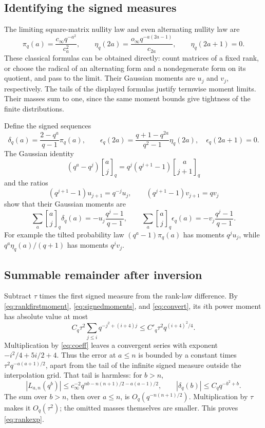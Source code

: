 \documentclass[11pt]{article}
\theoremstyle{definition}\newtheorem{definition}[theorem]{Definition}
\theoremstyle{remark}\newtheorem{remark}[theorem]{Remark}
\newcommand{\gb}[2]{\genfrac{[}{]}{0pt}{}{#1}{#2}_{q}}
\newcommand{\1}{\mathbf 1}
\begin{document}
\subsection{Identifying the signed measures}
The limiting square-matrix nullity law and even alternating nullity law are
\begin{equation}\label{eq:classical}
 \pi_q(a)=\frac{c_\infty q^{-a^2}}{c_a^2},\qquad
 \eta_q(2a)=\frac{o_\infty q^{-a(2a-1)}}{c_{2a}},\qquad
 \eta_q(2a+1)=0.
\end{equation}
These classical formulas can be obtained directly: count matrices of a
fixed rank, or choose the radical of an alternating form and a nondegenerate
form on its quotient, and pass to the limit. Their Gaussian moments are
$u_j$ and $v_j$, respectively. The tails of the displayed formulas justify
termwise moment limits. Their masses sum to one, since the same moment
bounds give tightness of the finite distributions.

Define the signed sequences
\begin{equation}\label{eq:signed}
 \delta_q(a)=\frac{2-q^a}{q-1}\pi_q(a),\qquad
 \epsilon_q(2a)=\frac{q+1-q^{2a}}{q^2-1}\eta_q(2a),\quad
 \epsilon_q(2a+1)=0.
\end{equation}
The Gaussian identity
\begin{equation}\label{eq:gaussrec}
 (q^a-q^j)\gb aj=q^j(q^{j+1}-1)\gb a{j+1}
\end{equation}
and the ratios
\[
 (q^{j+1}-1)u_{j+1}=q^{-j}u_j,\qquad
 (q^{j+1}-1)v_{j+1}=qv_j
\]
show that their Gaussian moments are
\begin{equation}\label{eq:signedmoments}
 \sum_a\gb aj\delta_q(a)=-u_j\frac{q^j-1}{q-1},\qquad
 \sum_a\gb aj\epsilon_q(a)=-v_j\frac{q^j-1}{q-1}.
\end{equation}
For example the tilted probability law $(q^a-1)\pi_q(a)$ has moments
$q^ju_j$, while $q^a\eta_q(a)/(q+1)$ has moments $q^jv_j$.

\subsection{Summable remainder after inversion}
Subtract $\tau$ times the first signed measure from the rank-law
difference. By \eqref{eq:rankfirstmoment}, \eqref{eq:signedmoments}, and
\eqref{eq:convert}, its $i$th power moment has absolute value at most
\[
 C_q\tau^2\sum_{j\le i}q^{-j^2+(i+4)j}
   \le C'_q\tau^2q^{(i+4)^2/4}.
\]
Multiplication by \eqref{eq:coeff} leaves a convergent series with exponent
$-i^2/4+5i/2+4$. Thus the error at $a\le n$ is bounded by a constant times
$\tau^2q^{-a(a+1)/2}$, apart from the tail of the infinite signed measure
outside the interpolation grid. That tail is harmless: for $b>n$,
\[
 |L_{a,n}(q^b)|\le
 c_\infty^{-2}q^{nb-n(n+1)/2-a(a-1)/2},\qquad
 |\delta_q(b)|\le C_q q^{-b^2+b}.
\]
The sum over $b>n$, then over $a\le n$, is
$O_q(q^{-n(n+1)/2})$. Multiplication by $\tau$ makes it
$O_q(\tau^2)$; the omitted masses themselves are smaller. This proves
\eqref{eq:rankexp}.
\end{document}
